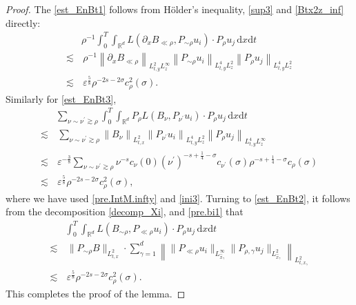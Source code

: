 \documentclass[11pt,letterpaper,reqno]{amsart}
\numberwithin{equation}{section}
\theoremstyle{definition}
\theoremstyle{remark}
\begin{document}
\begin{proof}    
The \eqref{est_EnBt1}  follows from
  H\"older's inequality,  \eqref{sup3} and \eqref{Btx2z_inf} directly:
\begin{align*}
& \rho^{-1} \int_0^T \int_{\mathbb{R}^{d}}    L(  \partial_xB_{\ll \rho }, P_{\sim\rho } u_i ) \cdot   P_{\rho} u_j  \,\mathrm{ d} x \mathrm{ d} t\\	
 \lesssim &\,    \rho^{-1} \left\| \partial_x B_{\ll \rho}\right\|_{L^2_{t,y }L^\infty_z } \left\|P_{\sim\rho }u_i \right\|_{L^4_{t,y } L^2_z }  \left\|P_{\rho} u_j \right\|_{L^4_{t,y } L^2_z }\nonumber \\
 \lesssim  &\, \varepsilon^{\frac58}\rho ^{-2s-2\sigma}c_{\rho }^2 (\sigma).  
\end{align*}	
Similarly for \eqref{est_EnBt3},  
\begin{align*}
&\sum_{\nu\sim \nu^\prime\gtrsim \rho }   \int_0^T \int_{\mathbb{R}^{d}}  P_\rho L(B_{ \nu},P_{\nu^\prime }u_i)\cdot P_{\rho} u_j \, \mathrm{ d} x \mathrm{ d} t\\
    \lesssim &\,   \sum_{\nu\sim \nu^\prime\gtrsim \rho }  \left\|B_{ \nu}\right\|_{L^2_{t,x} } \left\| P_{\nu^\prime}u_i \right\|_{L^4_{t,y } L^2_z }  \left\|P_{\rho}u_j \right\|_{ L^4_{t,y }L^\infty_z}\\
	\lesssim&\,\varepsilon^{-\frac{3}{8}}  \sum_{\nu\sim \nu^\prime\gtrsim \rho }     \nu^{-s} c_{\nu} (0) (\nu^\prime)^{-s+\frac 14-\sigma} c_{\nu^\prime} (\sigma) \rho^{-s+\frac 14-\sigma} c_\rho (\sigma)\\
	\lesssim&\, \varepsilon^{\frac58}\rho ^{-2s-2\sigma}c_{\rho }^2 (\sigma),
\end{align*}
where we have used \eqref{pre.IntM.infty} and \eqref{ini3}.
Turning to \eqref{est_EnBt2}, it  follows from the decomposition \eqref{decomp_Xi},  and \eqref{pre.bi1} that
\begin{align*}
&  \int_0^T \int_{\mathbb{R}^{d}}    L( B_{ \sim \rho }, P_{\ll \rho  } u_i )\cdot P_{\rho} u_j  \,\mathrm{ d} x \mathrm{ d} t \\	
 \lesssim &\,    \| P_{\sim \rho } B\|_{L^2_{t,x}} \cdot  \sum_{\gamma=1}^d  \left\| \|P_{\ll \rho  } u_i \|_{L^\infty_{\widehat{x}_\gamma }}  \|P_{\rho, \gamma}  u_j\|_{L^2_{\widehat{x}_\gamma}}\right\|_{L^2_{t,x_\gamma}}\\
	\lesssim&\, \varepsilon^{\frac58}\rho ^{-2s-2\sigma}c_{\rho }^2 (\sigma).
\end{align*}
This completes the proof of  the lemma.
\end{proof}
\end{document}
